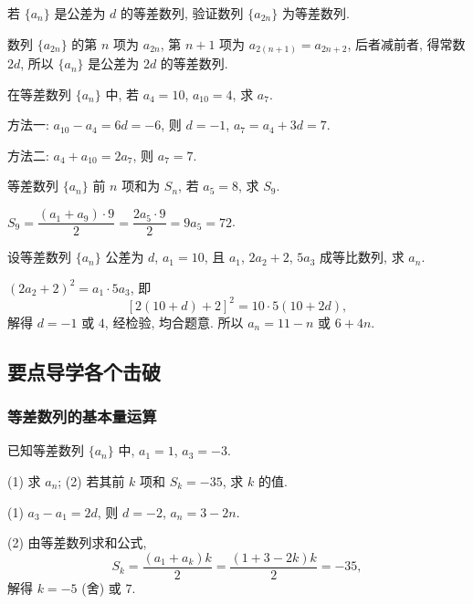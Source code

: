 \begin{exercise}
    若 $\{a_n\}$ 是公差为 $d$ 的等差数列, 验证数列 $\{a_{2n}\}$ 为等差数列.
\end{exercise}
\beginsolution
    数列 $\{a_{2n}\}$ 的第 $n$ 项为 $a_{2n}$, 第 $n+1$ 项为 $a_{2(n+1)}= a_{2n+2}$, 后者减前者, 得常数 $2d$, 所以 $\{a_n\}$ 是公差为 $2d$ 的等差数列.
\endsolution

\begin{exercise}
    在等差数列 $\{a_n\}$ 中, 若 $a_4=10$, $a_{10}=4$, 求 $a_7$.
\end{exercise}
\beginsolution
    方法一: $a_{10}- a_{4}= 6d= -6$, 则 $d=-1$, $a_7= a_4+3d= 7$.

    方法二: $a_4+a_{10}= 2a_7$, 则 $a_7= 7$.
\endsolution

\begin{exercise}
    等差数列 $\{a_n\}$ 前 $n$ 项和为 $S_n$, 若 $a_5=8$, 求 $S_9$.
\end{exercise}
\beginsolution
    $S_9= \dfrac{(a_1+a_9)\cdot 9}2
    = \dfrac{2a_5\cdot 9}2= 9a_5= 72$.
\endsolution

\begin{exercise}
    设等差数列 $\{a_n\}$ 公差为 $d$, $a_1=10$, 且 $a_1$, $2a_2+2$, $5a_3$ 成等比数列, 求 $a_n$.
\end{exercise}
\beginsolution
    $(2a_2+2)^2= a_1\cdot 5a_3$, 即
    \[[2(10+d)+2]^2= 10\cdot 5(10+2d),\]
    解得 $d= -1$ 或 $4$, 经检验, 均合题意. 所以 $a_n= 11-n$ 或 $6+4n$.
\endsolution

\subsection{要点导学\quad 各个击破}
\subsubsection{等差数列的基本量运算}
\begin{example}
    已知等差数列 $\{a_n\}$ 中, $a_1=1$, $a_3=-3$.
    
    (1) 求 $a_n$;\qquad
    (2) 若其前 $k$ 项和 $S_k=-35$, 求 $k$ 的值.
\end{example}
\beginsolution
    (1) $a_3- a_1= 2d$, 则 $d=-2$, $a_n= 3-2n$.

    (2) 由等差数列求和公式, 
    \[S_k= \frac{(a_1+a_k)k}2
        = \frac{(1+3-2k)k}2= -35,\]
    解得 $k=-5$ (舍) 或 $7$.
\endsolution

